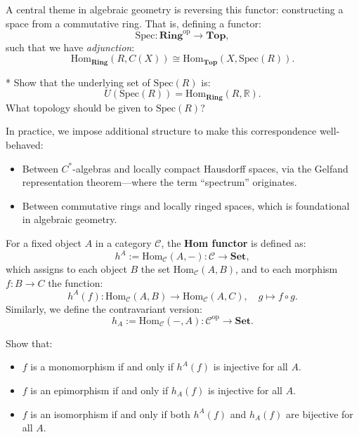 \begin{remark}
A central theme in algebraic geometry is reversing this functor: constructing a space from a commutative ring. That is, defining a functor:
\[
\mathrm{Spec}: \mathbf{Ring}^{\mathrm{op}} \to \mathbf{Top},
\]
such that we have \emph{adjunction}:
\[
\mathrm{Hom}_{\mathbf{Ring}}(R, C(X)) \cong \mathrm{Hom}_{\mathbf{Top}}(X, \mathrm{Spec}(R)).
\]

\begin{exercise}*
Show that the underlying set of $\mathrm{Spec}(R)$ is:
\[
U(\mathrm{Spec}(R)) = \mathrm{Hom}_{\mathbf{Ring}}(R, \mathbb{R} ).
\]
What topology should be given to $\mathrm{Spec}(R)$?
\end{exercise}

In practice, we impose additional structure to make this correspondence well-behaved:
\begin{itemize}
    \item Between $C^*$-algebras and locally compact Hausdorff spaces, via the Gelfand representation theorem—where the term “spectrum” originates.
    \item Between commutative rings and locally ringed spaces, which is foundational in algebraic geometry.
\end{itemize}
\end{remark}

\begin{example}
For a fixed object $A$ in a category $\mathcal{C}$, the \textbf{Hom functor} is defined as:
\[
h^A := \mathrm{Hom}_{\mathcal{C}}(A, -): \mathcal{C} \to \mathbf{Set},
\]
which assigns to each object $B$ the set $\mathrm{Hom}_{\mathcal{C}}(A, B)$, and to each morphism $f: B \to C$ the function:
\[
h^A(f): \mathrm{Hom}_{\mathcal{C}}(A, B) \to \mathrm{Hom}_{\mathcal{C}}(A, C), \quad g \mapsto f \circ g.
\]
Similarly, we define the contravariant version:
\[
h_A := \mathrm{Hom}_{\mathcal{C}}(-, A): \mathcal{C}^{\mathrm{op}} \to \mathbf{Set}.
\]
\end{example}

\begin{exercise}
Show that:
\begin{itemize}
    \item $f$ is a monomorphism if and only if $h^A(f)$ is injective for all $A$.
    \item $f$ is an epimorphism if and only if $h_A(f)$ is injective for all $A$.
    \item $f$ is an isomorphism if and only if both $h^A(f)$ and $h_A(f)$ are bijective for all $A$.
\end{itemize}
\end{exercise}

